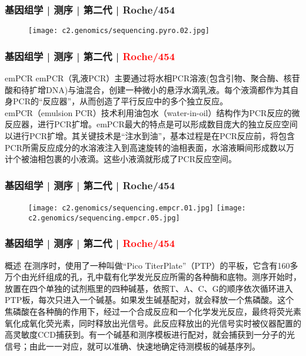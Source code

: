 \begin{frame}
  \frametitle{基因组学 | 测序 | 第二代 | Roche/454}
  \begin{figure}
    \centering
    \texttt{[image: c2.genomics/sequencing.pyro.02.jpg]}
  \end{figure}
\end{frame}

\begin{frame}
  \frametitle{基因组学 | 测序 | 第二代 | \textcolor{red}{Roche/454}}
  \begin{block}{emPCR}
emPCR（乳液PCR）主要通过将水相PCR溶液(包含引物、聚合酶、核苷酸和待扩增DNA)与油混合，创建一种微小的悬浮水滴乳液。每个液滴都作为其自身PCR的“反应器”，从而创造了平行反应中的多个独立反应。\\
\vspace{1em}
emPCR（emulsion PCR）技术利用油包水（water-in-oil）结构作为PCR反应的微反应器，进行PCR扩增。emPCR最大的特点是可以形成数目庞大的独立反应空间以进行PCR扩增。其关键技术是“注水到油”，基本过程是在PCR反应前，将包含PCR所需反应成分的水溶液注入到高速旋转的油相表面，水溶液瞬间形成数以万计个被油相包裹的小液滴。这些小液滴就形成了PCR反应空间。
  \end{block}
\end{frame}

\begin{frame}
  \frametitle{基因组学 | 测序 | 第二代 | Roche/454}
  \begin{figure}
    \centering
    \texttt{[image: c2.genomics/sequencing.empcr.01.jpg]}
    \qquad
    \texttt{[image: c2.genomics/sequencing.empcr.05.jpg]}
  \end{figure}
\end{frame}

\begin{frame}
  \frametitle{基因组学 | 测序 | 第二代 | \textcolor{red}{Roche/454}}
  \begin{block}{概述}
在测序时，使用了一种叫做“Pico TiterPlate”（PTP）的平板，它含有160多万个由光纤组成的孔，孔中载有化学发光反应所需的各种酶和底物。测序开始时，放置在四个单独的试剂瓶里的四种碱基，依照T、A、C、G的顺序依次循环进入PTP板，每次只进入一个碱基。如果发生碱基配对，就会释放一个焦磷酸。这个焦磷酸在各种酶的作用下，经过一个合成反应和一个化学发光反应，最终将荧光素氧化成氧化荧光素，同时释放出光信号。此反应释放出的光信号实时被仪器配置的高灵敏度CCD捕获到。有一个碱基和测序模板进行配对，就会捕获到一分子的光信号；由此一一对应，就可以准确、快速地确定待测模板的碱基序列。
  \end{block}
\end{frame}

